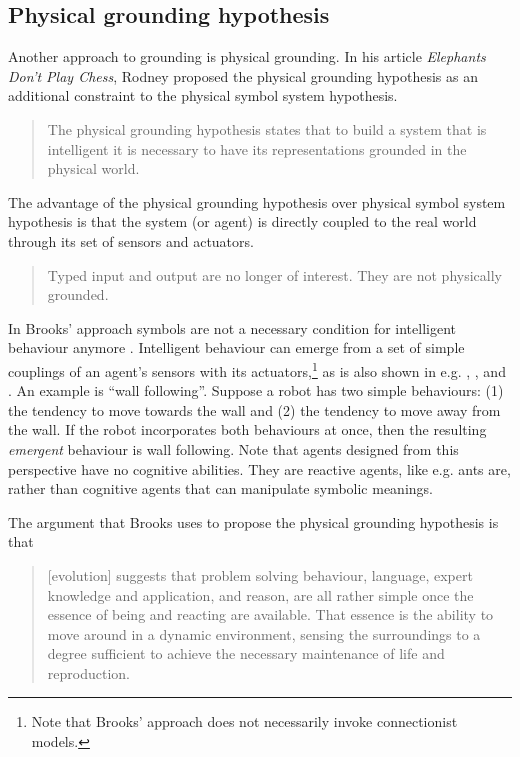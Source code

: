 \subsection{Physical grounding hypothesis}\label{s:theory:pgh}

Another approach to grounding is physical grounding. In his article {\em Elephants Don't Play Chess}, Rodney \citet{brooks:1990} proposed the physical grounding hypothesis as an additional constraint to the physical symbol system hypothesis. 


\begin{quote}
The physical grounding hypothesis states that to build a system that is intelligent it is necessary to have its representations grounded in the physical world. \citep{brooks:1990}
\end{quote}

The advantage of the physical grounding hypothesis over physical symbol system hypothesis is that the system (or agent) is directly coupled to the real world through its set of sensors and actuators. 

\begin{quote}
Typed input and output are no longer of interest. They are not physically grounded. \citep{brooks:1990}
\end{quote}

In Brooks' approach symbols are not a necessary condition for intelligent behaviour anymore \citep{brooks:1990,brooks:1991}. Intelligent behaviour can emerge from a set of simple couplings of an agent's sensors with its actuators,\footnote{Note that Brooks' approach does not necessarily invoke connectionist models.} as is also shown in e.g. \citealt{steelsbrooks:1993}, \citealt{steels:1994}, and \citealt{steels:1996c}. An example is ``wall following''. Suppose a robot has two simple behaviours: (1) the tendency to move towards the wall and (2) the tendency to move away from the wall. If the robot incorporates both behaviours at once, then the resulting {\em emergent} behaviour is wall following. Note that agents designed from this perspective have no cognitive abilities. They are reactive agents, like e.g. ants are, rather than cognitive agents that can manipulate symbolic meanings.

The argument that Brooks uses to propose the physical grounding hypothesis is that

\begin{quote}
[evolution] suggests that problem solving behaviour, language, expert know\-ledge and application, and reason, are all rather simple once the essence of being and reacting are available. That essence is the ability to move around in a dynamic environment, sensing the surroundings to a degree sufficient to achieve the necessary maintenance of life and reproduction. \citep{brooks:1990}
\end{quote}


